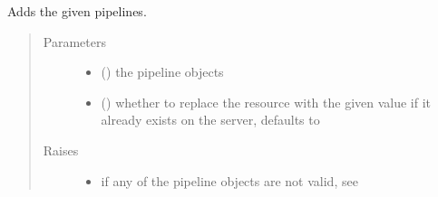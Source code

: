 \documentclass[letterpaper,10pt,english]{sphinxmanual}
\begin{document}
\begin{fulllineitems}
\begin{fulllineitems}
\end{fulllineitems}


\begin{fulllineitems}
\label{\detokenize{autoapi/pine/client/client/index:pine.client.client.EveClient.add_pipelines}}
\sphinxAtStartPar
Adds the given pipelines.
\begin{quote}\begin{description}
\item[{Parameters}] \leavevmode\begin{itemize}
\item {} 
\sphinxAtStartPar
{} (\sphinxstyleliteralemphasis{\sphinxupquote{(}}\sphinxstyleliteralemphasis{\sphinxupquote{)}}) \textendash{} the pipeline objects

\item {} 
\sphinxAtStartPar
{} (\sphinxstyleliteralemphasis{\sphinxupquote{, }}) \textendash{} whether to replace the resource with the given value if it already exists on the server, defaults to 

\end{itemize}

\item[{Raises}] \leavevmode\begin{itemize}
\item {} 
\sphinxAtStartPar
{\hyperref[\detokenize{autoapi/pine/client/exceptions/index:pine.client.exceptions.PineClientValueException}]{}} \textendash{} if any of the pipeline objects are not valid, see {\hyperref[\detokenize{autoapi/pine/client/models/index:pine.client.models.is_valid_eve_pipeline}]{}}


\end{itemize}
\end{description}
\end{quote}
\end{fulllineitems}
\end{fulllineitems}
\end{document}
